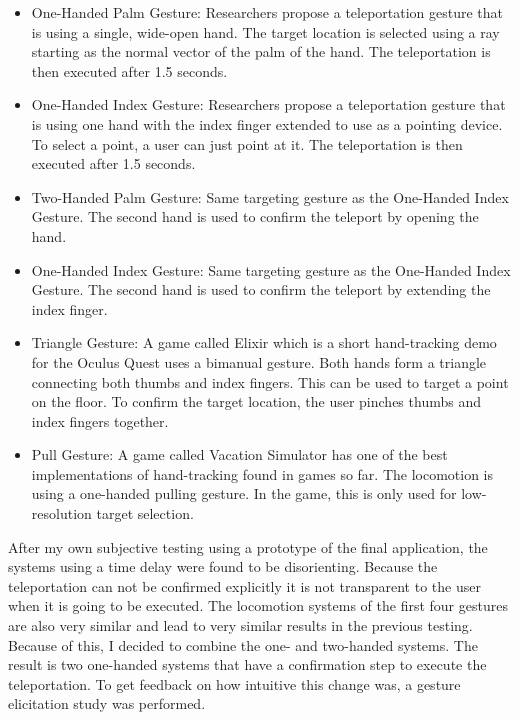 \begin{itemize}
    \item One-Handed Palm Gesture: %
    Researchers propose a teleportation gesture that is using a single, wide-open hand. The target location is selected using a ray starting as the normal vector of the palm of the hand. The teleportation is then executed after 1.5 seconds.

    \item One-Handed Index Gesture: %
    Researchers propose a teleportation gesture that is using one hand with the index finger extended to use as a pointing device. To select a point, a user can just point at it. The teleportation is then executed after 1.5 seconds.
    
    \item Two-Handed Palm Gesture: %
    Same targeting gesture as the One-Handed Index Gesture. The second hand is used to confirm the teleport by opening the hand.

    \item One-Handed Index Gesture: %
    Same targeting gesture as the One-Handed Index Gesture. The second hand is used to confirm the teleport by extending the index finger.

    \item Triangle Gesture: %
    A game called Elixir which is a short hand-tracking demo for the Oculus Quest uses a bimanual gesture. Both hands form a triangle connecting both thumbs and index fingers. This can be used to target a point on the floor. To confirm the target location, the user pinches thumbs and index fingers together.
    
    \item Pull Gesture: %
    A game called Vacation Simulator has one of the best implementations of hand-tracking found in games so far. The locomotion is using a one-handed pulling gesture. In the game, this is only used for low-resolution target selection.
\end{itemize}

After my own subjective testing using a prototype of the final application, the systems using a time delay were found to be disorienting. Because the teleportation can not be confirmed explicitly it is not transparent to the user when it is going to be executed. The locomotion systems of the first four gestures are also very similar and lead to very similar results in the previous testing. Because of this, I decided to combine the one- and two-handed systems. The result is two one-handed systems that have a confirmation step to execute the teleportation. To get feedback on how intuitive this change was, a gesture elicitation study was performed. 

